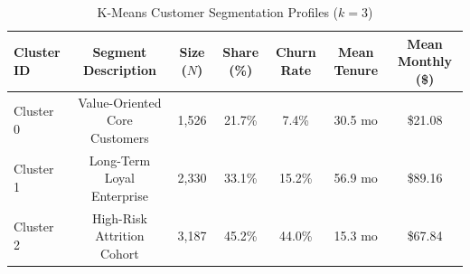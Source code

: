 \begin{table}[H]
\centering
\caption{K-Means Customer Segmentation Profiles ($k=3$)}
\label{tab:cluster_profiles}
\begin{tabular}{lcccccc}
\toprule
\textbf{Cluster ID} & \textbf{Segment Description} & \textbf{Size ($N$)} & \textbf{Share (\%)} & \textbf{Churn Rate} & \textbf{Mean Tenure} & \textbf{Mean Monthly (\$)} \\
\midrule
Cluster 0 & Value-Oriented Core Customers & 1,526 & 21.7\% & 7.4\% & 30.5 mo & \$21.08 \\
Cluster 1 & Long-Term Loyal Enterprise & 2,330 & 33.1\% & 15.2\% & 56.9 mo & \$89.16 \\
Cluster 2 & High-Risk Attrition Cohort & 3,187 & 45.2\% & 44.0\% & 15.3 mo & \$67.84 \\
\bottomrule
\end{tabular}
\end{table}